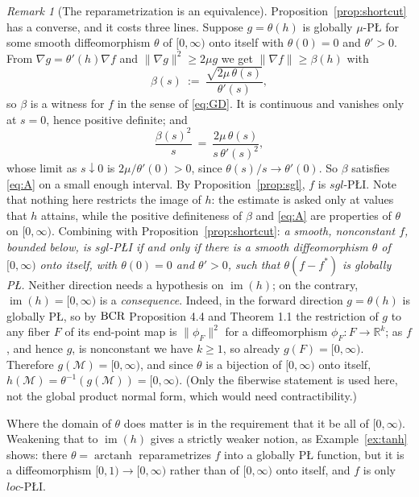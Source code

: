 \documentclass[11pt]{article}
\theoremstyle{plain}
\theoremstyle{definition}
\theoremstyle{remark}
\newtheorem{rem}[thm]{Remark}
\newcommand{\M}{\mathcal{M}}
\newcommand{\R}{\mathbb{R}}
\newcommand{\bcr}{\textup{BCR}}
\begin{document}
\begin{rem}[The reparametrization is an equivalence]\label{rem:equiv}
Proposition~\ref{prop:shortcut} has a converse, and it costs three lines. Suppose
$g=\theta(h)$ is globally $\mu$-P\L{} for some smooth diffeomorphism $\theta$ of
$[0,\infty)$ onto itself with $\theta(0)=0$ and $\theta'>0$. From $\nabla g = \theta'(h)\nabla f$ and
$\|\nabla g\|^2\ge2\mu g$ we get $\|\nabla f\|\ge\beta(h)$ with
\[
  \beta(s) \ :=\ \frac{\sqrt{2\mu\,\theta(s)}}{\theta'(s)} ,
\]
so $\beta$ is a witness for $f$ in the sense of \eqref{eq:GD}. It is continuous and
vanishes only at $s=0$, hence positive definite; and
\[
  \frac{\beta(s)^2}{s} \ =\ \frac{2\mu\,\theta(s)}{s\,\theta'(s)^2} ,
\]
whose limit as $s\downarrow0$ is $2\mu/\theta'(0)>0$, since $\theta(s)/s\to\theta'(0)$.
So $\beta$ satisfies \eqref{eq:A} on a small enough interval. By
Proposition~\ref{prop:sgl}, $f$ is $sgl$-P\L{}I. Note that nothing here restricts the
image of $h$: the estimate is asked only at values that $h$ attains, while the
positive definiteness of $\beta$ and \eqref{eq:A} are properties of $\theta$ on
$[0,\infty)$. Combining with Proposition~\ref{prop:shortcut}:
\emph{a smooth, nonconstant $f$, bounded below, is $sgl$-P\L{}I if and only if there
is a smooth diffeomorphism $\theta$ of $[0,\infty)$ onto itself, with $\theta(0)=0$
and $\theta'>0$, such that $\theta(f-f^*)$ is globally P\L{}.} Neither direction needs
a hypothesis on $\operatorname{im}(h)$; on the contrary, $\operatorname{im}(h) =
[0,\infty)$ is a \emph{consequence}. Indeed, in the forward direction $g=\theta(h)$
is globally P\L{}, so by $\bcr$ Proposition 4.4 and Theorem 1.1 the restriction of
$g$ to any fiber
$F$ of its end-point map is $\|\phi_F\|^2$ for a diffeomorphism
$\phi_F\colon F\to\R^k$; as $f$, and hence $g$, is nonconstant we have $k\ge1$, so
already $g(F)=[0,\infty)$. Therefore $g(\M)=[0,\infty)$, and since $\theta$ is a
bijection of $[0,\infty)$ onto itself,
$h(\M)=\theta^{-1}(g(\M))=[0,\infty)$. (Only the fiberwise statement is used here,
not the global product normal form, which would need contractibility.)

Where the domain of $\theta$ does matter is in the requirement that it be all of
$[0,\infty)$. Weakening that to $\operatorname{im}(h)$ gives a strictly weaker notion,
as Example~\ref{ex:tanh} shows: there $\theta=\operatorname{arctanh}$ reparametrizes
$f$ into a globally P\L{} function, but it is a diffeomorphism $[0,1)\to[0,\infty)$
rather than of $[0,\infty)$ onto itself, and $f$ is only $loc$-P\L{}I.
\end{rem}
\end{document}
